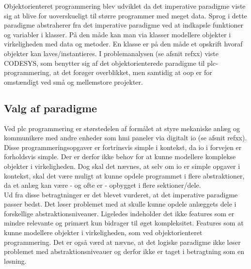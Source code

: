Objektorienteret programmering blev udviklet da det imperative paradigme viste sig at blive for uoverskueligt til større programmer med meget data. Sprog i dette paradigme abstraherer fra det imperative paradigme ved at indkapsle funktioner og variabler i klasser. På den måde kan man via klasser modellere objekter i virkeligheden med data og metoder. En klasse er på den måde et opskrift hvoraf objekter kan laves/instantieres. I problemanalysen (se afsnit refxx) viste CODESYS, som benytter sig af det objektorienterede paradigme til \gls{plc}-programmering, at det forøger overblikket, men samtidig at \gls{oop} er for omstændigt ved små og mellemstore projekter.

\subsection{Valg af paradigme}\label{ssec:paradigmevalg}
Ved \gls{plc} programmering er størstedelen af formålet at styre mekaniske anlæg og kommunikere med andre enheder som \gls{hmi} paneler via digitalt \gls{io} (se afsnit refxx). Disse programmeringsopgaver er fortrinsvis simple i kontekst, da \gls{io} i forvejen er forholdsvis simple. Der er derfor ikke behov for at kunne modellere komplekse objekter i virkeligheden. Dog skal det nævnes, at selv om \gls{io} er simple opgaver i kontekst, skal det være muligt at kunne opdele programmet i flere abstraktioner, da et anlæg kan være - og ofte er - opbygget i flere sektioner/dele. \\

\noindent Ud fra disse betragtninger er det blevet vurderet, at det imperative paradigme passer bedst. Det løser problemet med at skulle kunne opdele anlæggets dele i forskellige abstraktionsniveauer. Ligeledes indeholder det ikke features som er mindre relevante og primært kun bidrager til øget kompleksitet. Features som at kunne modellere objekter i virkeligheden, som ved objektorienteret programmering. Det er også værd at nævne, at det logiske paradigme ikke løser problemet med abstraktionsniveauer og derfor ikke er taget i betragtning som en løsning.


